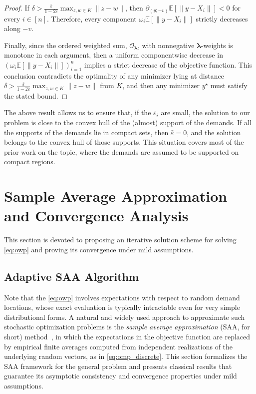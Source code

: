 \documentclass[letter,11pt, reqno]{amsart}
\newcommand{\E}{\mathbb{E}}
\renewcommand{\O}{\mathcal{O}}
\renewcommand{\;}{\quad}
\theoremstyle{thmstyleone}%
\theoremstyle{thmstyletwo}%
\theoremstyle{thmstylethree}%
\begin{document}
\begin{proof}
If $\delta>\frac{\bar\varepsilon}{1-2\bar\varepsilon}\max_{z, w \in K}\|z-w\|$, then $\partial_{(y;-v)} \E[\|y-X_i\|]<0$ for every $i\in [n]$. 
Therefore, every component $\omega_i\E\left[\|y-X_i\|\right]$ strictly decreases along $-v$.

Finally, since the ordered weighted sum, $\O_{\bm\lambda}$, with nonnegative $\bm \lambda$-weights is monotone in each argument, then a uniform componentwise decrease in $\left(\omega_i\E[\|y-X_i\|]\right)_{i=1}^n$ implies a strict decrease of the objective function. This conclusion contradicts the optimality of any minimizer lying at distance $\delta > \frac{\bar\varepsilon}{1-2\bar\varepsilon}\max_{z, w \in K}\|z-w\|$ from $K$, and then any minimizer $y^\star$ must satisfy the stated bound.
\end{proof}
The above result allows us to ensure that, if the $\varepsilon_i$ are small, the solution to our problem is close to the convex hull of the (almost) support of the demands. If all the supports of the demands lie in compact sets, then $\bar{\varepsilon} = 0$, and the solution belongs to the convex hull of those supports. This situation covers most of the prior work on the topic, where the demands are assumed to be supported on compact regions.

\section{Sample Average Approximation and Convergence Analysis}\label{sec:saa}

This section is devoted to proposing an iterative solution scheme for solving \ref{eq:owp} and proving its convergence under mild assumptions.
\subsection*{Adaptive SAA Algorithm}
Note that the \ref{eq:owp} involves expectations with respect to random demand locations, whose exact evaluation is typically intractable even for very simple distributional forms. A natural and widely used approach to approximate such stochastic optimization problems is the \emph{sample average approximation} (SAA, for short) method~\citep{ShapiroHomemDeMello2000}, in which the expectations in the objective function are replaced by empirical finite averages computed from independent realizations of the underlying random vectors, as in \ref{eq:omp_discrete}. This section formalizes the SAA framework for the general problem and presents classical results that guarantee its asymptotic consistency and convergence properties under mild assumptions. 
\end{document}
